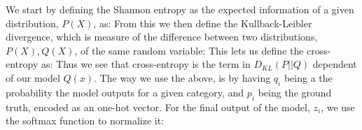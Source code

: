 We start by defining the Shannon entropy as the expected information of a given distribution, $P(X)$, as:
From this we then define the Kullback-Leibler divergence, which is measure of the difference between two distributions, $P(X),Q(X)$, of the same random variable:
This lets us define the cross-entropy as:
Thus we see that cross-entropy is the term in $D_{KL}(P || Q)$ dependent of our model $Q(x)$. 
The way we use the above, is by having $q_i$ being a the probability the model outputs for a given category, and $p_i$ being the ground truth, encoded as an one-hot vector.
For the final output of the model, $z_i$, we use the softmax function to normalize it:

